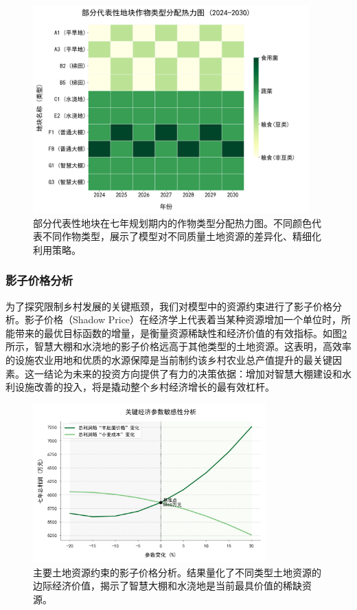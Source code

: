 \begin{figure}[htbp]
    \centering
    \includegraphics[width=0.95\textwidth]{figs/3问题一/land_utilization.png}

    \caption{部分代表性地块在七年规划期内的作物类型分配热力图。不同颜色代表不同作物类型，展示了模型对不同质量土地资源的差异化、精细化利用策略。}
    \label{fig:land_utilization}
\end{figure}

\subsubsection{影子价格分析}

为了探究限制乡村发展的关键瓶颈，我们对模型中的资源约束进行了影子价格分析。影子价格（Shadow Price）在经济学上代表着当某种资源增加一个单位时，所能带来的最优目标函数的增量，是衡量资源稀缺性和经济价值的有效指标。如图\ref{fig:shadow_price}所示，智慧大棚和水浇地的影子价格远高于其他类型的土地资源。这表明，高效率的设施农业用地和优质的水源保障是当前制约该乡村农业总产值提升的最关键因素。这一结论为未来的投资方向提供了有力的决策依据：增加对智慧大棚建设和水利设施改善的投入，将是撬动整个乡村经济增长的最有效杠杆。

\begin{figure}[htbp]
    \centering
    \includegraphics[width=0.8\textwidth]{figures/shadow_price.png}
    \caption{主要土地资源约束的影子价格分析。结果量化了不同类型土地资源的边际经济价值，揭示了智慧大棚和水浇地是当前最具价值的稀缺资源。}
    \label{fig:shadow_price}
\end{figure}

